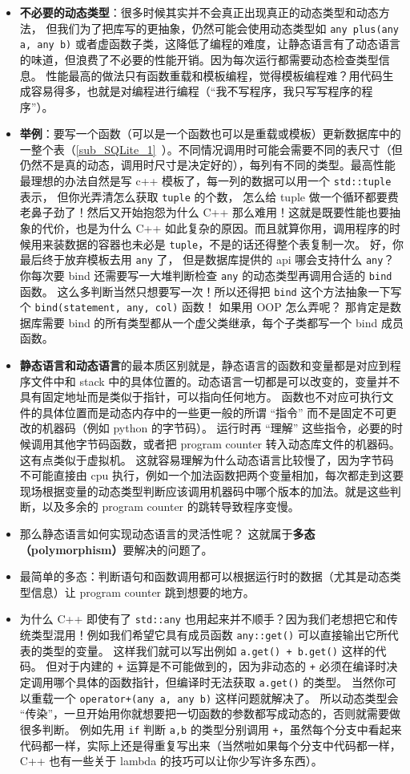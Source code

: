 \begin{itemize}
\item \textbf{不必要的动态类型}：很多时候其实并不会真正出现真正的动态类型和动态方法， 但我们为了把库写的更抽象，仍然可能会使用动态类型如 \verb`any plus(any a, any b)` 或者虚函数子类，这降低了编程的难度，让静态语言有了动态语言的味道，但浪费了不必要的性能开销。因为每次运行都需要动态检查类型信息。 性能最高的做法只有函数重载和模板编程，觉得模板编程难？用代码生成容易得多，也就是对编程进行编程（“我不写程序，我只写写程序的程序”）。
\item \textbf{举例}：要写一个函数（可以是一个函数也可以是重载或模板）更新数据库中的一整个表（\autoref{sub_SQLite_1}~）。不同情况调用时可能会需要不同的表尺寸（但仍然不是真的动态，调用时尺寸是决定好的），每列有不同的类型。最高性能最理想的办法自然是写 c++ 模板了，每一列的数据可以用一个 \verb`std::tuple` 表示， 但你光弄清怎么获取 \verb`tuple` 的个数， 怎么给 tuple 做一个循环都要费老鼻子劲了！然后又开始抱怨为什么 C++ 那么难用！这就是既要性能也要抽象的代价，也是为什么 C++ 如此复杂的原因。而且就算你用，调用程序的时候用来装数据的容器也未必是 \verb`tuple`，不是的话还得整个表复制一次。 好，你最后终于放弃模板去用 \verb`any` 了， 但是数据库提供的 api 哪会支持什么 \verb`any`？ 你每次要 bind 还需要写一大堆判断检查 \verb`any` 的动态类型再调用合适的 \verb`bind` 函数。 这么多判断当然只想要写一次！所以还得把 \verb`bind` 这个方法抽象一下写个 \verb`bind(statement, any, col)` 函数！ 如果用 OOP 怎么弄呢？ 那肯定是数据库需要 bind 的所有类型都从一个虚父类继承，每个子类都写一个 bind 成员函数。
\item \textbf{静态语言和动态语言}的最本质区别就是，静态语言的函数和变量都是对应到程序文件中和 stack 中的具体位置的。动态语言一切都是可以改变的，变量并不具有固定地址而是类似于指针，可以指向任何地方。 函数也不对应可执行文件的具体位置而是动态内存中的一些更一般的所谓 “指令” 而不是固定不可更改的机器码（例如 python 的字节码）。 运行时再 “理解” 这些指令，必要的时候调用其他字节码函数，或者把 program counter 转入动态库文件的机器码。 这有点类似于虚拟机。 这就容易理解为什么动态语言比较慢了，因为字节码不可能直接由 cpu 执行，例如一个加法函数把两个变量相加，每次都走到这要现场根据变量的动态类型判断应该调用机器码中哪个版本的加法。就是这些判断，以及多余的 program counter 的跳转导致程序变慢。
\item 那么静态语言如何实现动态语言的灵活性呢？ 这就属于\textbf{多态（polymorphism）}要解决的问题了。
\item 最简单的多态：判断语句和函数调用都可以根据运行时的数据（尤其是动态类型信息）让 program counter 跳到想要的地方。
\item 为什么 C++ 即使有了 \verb`std::any` 也用起来并不顺手？因为我们老想把它和传统类型混用！例如我们希望它具有成员函数 \verb`any::get()` 可以直接输出它所代表的类型的变量。 这样我们就可以写出例如 \verb`a.get() + b.get()` 这样的代码。 但对于内建的 \verb`+` 运算是不可能做到的，因为非动态的 \verb`+` 必须在编译时决定调用哪个具体的函数指针，但编译时无法获取 \verb`a.get()` 的类型。 当然你可以重载一个 \verb`operator+(any a, any b)` 这样问题就解决了。 所以动态类型会 “传染”，一旦开始用你就想要把一切函数的参数都写成动态的，否则就需要做很多判断。 例如先用 \verb`if` 判断 \verb`a,b` 的类型分别调用 \verb`+`，虽然每个分支中看起来代码都一样，实际上还是得重复写出来（当然啦如果每个分支中代码都一样， C++ 也有一些关于 lambda 的技巧可以让你少写许多东西）。
\end{itemize}
